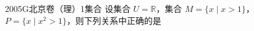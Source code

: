 
\begin{problem}{2005}{G}{北京卷（理）}{1}{集合}
设集合 $ U=\mathbb{R} $，集合 $ M=\{x\mid x>1\} $，$ P=\{x\mid x^2>1\} $，则下列关系中正确的是
\begin{choices}
\end{choices}
\end{problem}

\begin{answer}

\end{answer}

\begin{solutions}

\end{solutions}
